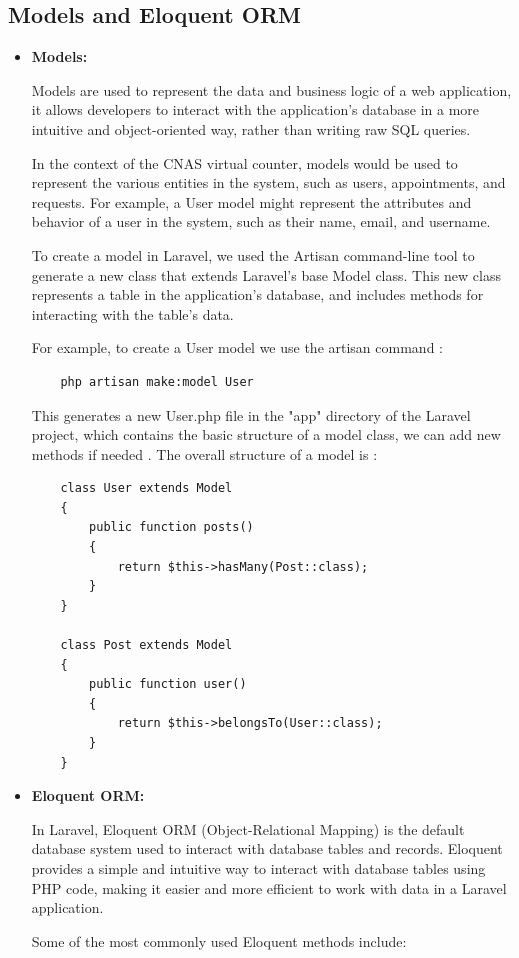 \subsection{Models and Eloquent ORM}
\begin{itemize}
 \item \textbf{Models:}

Models are used to represent the data and business logic of a web application, it allows developers to interact with the application's database in a more intuitive and object-oriented way, rather than writing raw SQL queries.

In the context of the CNAS virtual counter, models would be used to represent the various entities in the system, such as users, appointments, and requests. For example, a User model might represent the attributes and behavior of a user in the system, such as their name, email, and username.

To create a model in Laravel, we used the Artisan command-line tool to generate a new class that extends Laravel's base Model class. This new class represents a table in the application's database, and includes methods for interacting with the table's data.

For example, to create a User model we use the artisan command : 
\begin{verbatim}
    php artisan make:model User
\end{verbatim}
This generates a new User.php file in the "app" directory of the Laravel project, which contains the basic structure of a model class, we can add new methods if needed .
\newpage
The overall structure of a model is : 
\begin{verbatim}
    class User extends Model
    {
        public function posts()
        {
            return $this->hasMany(Post::class);
        }
    }

    class Post extends Model
    {
        public function user()
        {
            return $this->belongsTo(User::class);
        }
    }
\end{verbatim}
\item \textbf{Eloquent ORM: }

In Laravel, Eloquent ORM (Object-Relational Mapping) is the default database system used to interact with database tables and records. Eloquent provides a simple and intuitive way to interact with database tables using PHP code, making it easier and more efficient to work with data in a Laravel application.

Some of the most commonly used Eloquent methods include:
\begin{itemize}
     

\end{itemize}
\end{itemize}
